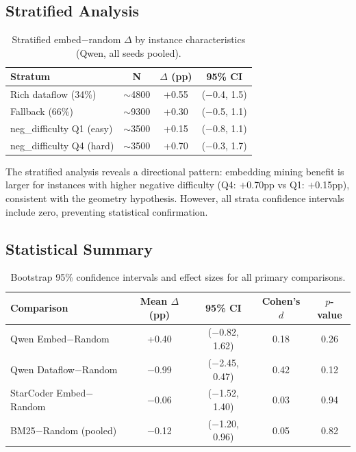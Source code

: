 \documentclass[11pt]{article}
\begin{document}
\subsection{Stratified Analysis}

\begin{table}[h]
\centering
\caption{Stratified embed$-$random $\Delta$ by instance characteristics (Qwen, all seeds pooled).}
\label{tab:stratified}
\begin{tabular}{lccc}
\toprule
Stratum & N & $\Delta$ (pp) & 95\% CI \\
\midrule
Rich dataflow (34\%) & $\sim$4800 & +0.55 & ($-$0.4, 1.5) \\
Fallback (66\%) & $\sim$9300 & +0.30 & ($-$0.5, 1.1) \\
neg\_difficulty Q1 (easy) & $\sim$3500 & +0.15 & ($-$0.8, 1.1) \\
neg\_difficulty Q4 (hard) & $\sim$3500 & +0.70 & ($-$0.3, 1.7) \\
\bottomrule
\end{tabular}
\end{table}

The stratified analysis reveals a directional pattern: embedding mining benefit is larger for instances with higher negative difficulty (Q4: $+$0.70pp vs Q1: $+$0.15pp), consistent with the geometry hypothesis. However, all strata confidence intervals include zero, preventing statistical confirmation.

\subsection{Statistical Summary}

\begin{table}[h]
\centering
\caption{Bootstrap 95\% confidence intervals and effect sizes for all primary comparisons.}
\label{tab:stats}
\begin{tabular}{lcccc}
\toprule
Comparison & Mean $\Delta$ (pp) & 95\% CI & Cohen's $d$ & $p$-value \\
\midrule
Qwen Embed$-$Random & +0.40 & ($-$0.82, 1.62) & 0.18 & 0.26 \\
Qwen Dataflow$-$Random & $-$0.99 & ($-$2.45, 0.47) & 0.42 & 0.12 \\
StarCoder Embed$-$Random & $-$0.06 & ($-$1.52, 1.40) & 0.03 & 0.94 \\
BM25$-$Random (pooled) & $-$0.12 & ($-$1.20, 0.96) & 0.05 & 0.82 \\
\bottomrule
\end{tabular}
\end{table}
\end{document}
